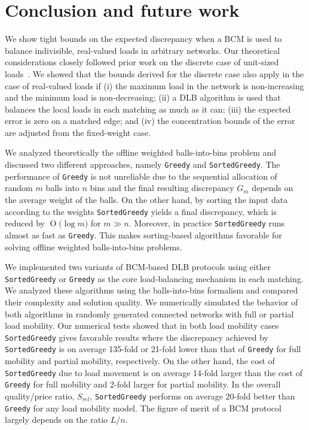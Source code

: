 \documentclass[12pt,psfig,a4]{article}
\newcommand{\sg}{\texttt{SortedGreedy}}
\newcommand{\gr}{\texttt{Greedy}}
\newcommand{\BigO}[1]{\ensuremath{\operatorname{O}\bigl(#1\bigr)}}
\theoremstyle{plain}
\begin{document}
\section{Conclusion and future work}
\label{sec:conclusion}
We show tight bounds on the expected discrepancy when a BCM is used to balance indivisible, real-valued loads in arbitrary networks. Our theoretical considerations closely followed prior work on the discrete case of unit-sized loads~\cite{sauerwald2012tight}. We showed that the bounds derived for the discrete case also apply in the case of real-valued loads if (i) the maximum load in the network is non-increasing and the minimum load is non-decreasing; (ii) a DLB algorithm is used that balances the local loads in each matching as much as it can; (iii) the expected error is zero on a matched edge; and (iv) the concentration bounds of the error are adjusted from the fixed-weight case.

We analyzed theoretically the offline weighted balls-into-bins problem and discussed two different approaches, namely \gr{} and \sg{}. The performance of \gr{} is not unreliable due to the sequential allocation of random $m$ balls into $n$ bins and the final resulting discrepancy $G_m$ depends on the average weight of the balls. On the other hand, by sorting the input data according to the weights \sg{} yields a final discrepancy, which is reduced by \BigO{\log{m}} for $m\gg n$. Moreover, in practice \sg{} runs almost as fast as \gr{}. This makes sorting-based algorithms favorable for solving offline weighted balls-into-bins problems.

We implemented two variants of BCM-based DLB protocols using either \sg{} or \gr{} as the core load-balancing mechanism in each matching. We analyzed these algorithms using the balls-into-bins formalism and compared their complexity and solution quality. We numerically simulated the behavior of both algorithms in randomly generated connected networks with full or partial load mobility. Our numerical tests showed that in both load mobility cases \sg{} gives favorable results where the discrepancy achieved by \sg{} is on average 135-fold or 21-fold lower than that of \gr{} for full mobility and partial mobility, respectively. On the other hand, the cost of \sg{} due to load movement is on average 14-fold larger than the cost of \gr{} for full mobility and 2-fold larger for partial mobility. In the overall quality/price ratio, $S_{rel}$, \sg{} performs on average 20-fold better than \gr{} for any load mobility model. The figure of merit of a BCM protocol largely depends on the ratio $L/n$. 
\end{document}

